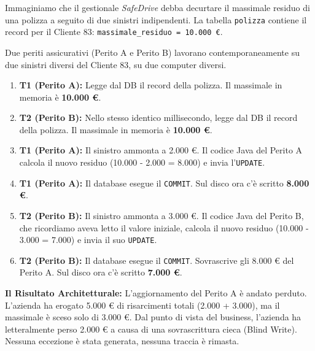 \begin{example}
Immaginiamo che il gestionale \textit{SafeDrive} debba decurtare il massimale residuo di una polizza a seguito di due sinistri indipendenti.
La tabella \texttt{polizza} contiene il record per il Cliente 83: \texttt{massimale\_residuo = 10.000 €}.

Due periti assicurativi (Perito A e Perito B) lavorano contemporaneamente su due sinistri diversi del Cliente 83, su due computer diversi.
\begin{enumerate}
    \item \textbf{T1 (Perito A):} Legge dal DB il record della polizza. Il massimale in memoria è \textbf{10.000 €}.
    \item \textbf{T2 (Perito B):} Nello stesso identico millisecondo, legge dal DB il record della polizza. Il massimale in memoria è \textbf{10.000 €}.
    \item \textbf{T1 (Perito A):} Il sinistro ammonta a 2.000 €. Il codice Java del Perito A calcola il nuovo residuo (10.000 - 2.000 = 8.000) e invia l'\texttt{UPDATE}.
    \item \textbf{T1 (Perito A):} Il database esegue il \texttt{COMMIT}. Sul disco ora c'è scritto \textbf{8.000 €}.
    \item \textbf{T2 (Perito B):} Il sinistro ammonta a 3.000 €. Il codice Java del Perito B, che ricordiamo aveva letto il valore iniziale, calcola il nuovo residuo (10.000 - 3.000 = 7.000) e invia il suo \texttt{UPDATE}.
    \item \textbf{T2 (Perito B):} Il database esegue il \texttt{COMMIT}. Sovrascrive gli 8.000 € del Perito A. Sul disco ora c'è scritto \textbf{7.000 €}.
\end{enumerate}

\textbf{Il Risultato Architetturale:} L'aggiornamento del Perito A è andato perduto. L'azienda ha erogato 5.000 € di risarcimenti totali (2.000 + 3.000), ma il massimale è sceso solo di 3.000 €. Dal punto di vista del business, l'azienda ha letteralmente perso 2.000 € a causa di una sovrascrittura cieca (Blind Write). Nessuna eccezione è stata generata, nessuna traccia è rimasta.
\end{example}


